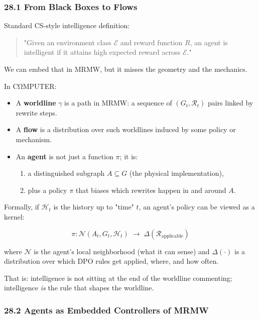 \subsubsection*{28.1  From Black Boxes to Flows}

Standard CS-style intelligence definition:

\begin{quote}
"Given an environment class $\mathcal{E}$ and reward function $R$, an agent is intelligent if it attains high expected reward across $\mathcal{E}$."  
\end{quote}

We can embed that in MRMW, but it misses the geometry and the mechanics.

In CΩMPUTER:

\begin{itemize}
  \item A \textbf{worldline} $\gamma$ is a path in MRMW: a sequence of $(G_t,\mathcal{R}_t)$
        pairs linked by rewrite steps.

  \item A \textbf{flow} is a distribution over such worldlines induced by some policy or mechanism.

  \item An \textbf{agent} is not just a function $\pi$; it is:
    \begin{enumerate}
      \item a distinguished subgraph $A \subseteq G$ (the physical implementation),
      \item plus a policy $\pi$ that biases which rewrites happen in and around $A$.
    \end{enumerate}
\end{itemize}

Formally, if $\mathcal{H}_t$ is the history up to "time" $t$, an agent's policy
can be viewed as a kernel:

\[
  \pi : \mathcal{N}(A_t, G_t, \mathcal{H}_t) \;\longrightarrow\; \Delta(\mathcal{R}_{\text{applicable}})
\]

where $\mathcal{N}$ is the agent's local neighborhood (what it can sense) and
$\Delta(\cdot)$ is a distribution over which DPO rules get applied, where, and how often.

That is: intelligence is not sitting at the end of the worldline commenting;
intelligence \emph{is} the rule that shapes the worldline.

\subsubsection*{28.2  Agents as Embedded Controllers of MRMW}


